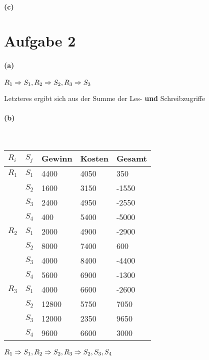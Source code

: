 \documentclass[11pt,a4paper,parskip=half ]{scrartcl}
\begin{document}
	\paragraph{(c)}
	
	
	\section*{Aufgabe 2}
	\paragraph{(a)} 
	$R_{1}\Rightarrow S_{1},\\
	 R_{2}\Rightarrow S_{2},\\
	 R_{3}\Rightarrow S_{3}$
	
	Letzteres ergibt sich aus der Summe der Les- \textbf{und} Schreibzugriffe
	
	\paragraph{(b)}~ 
	\begin{table}[h]
		\begin{tabular}{l|l|l|l|l}
			$R_{i}$	& $S_{j}$ & Gewinn & Kosten & Gesamt \\ \hline \hline
			$R_{1}$ & $S_{1}$ & 4400   & 4050   & 350          \\
					& $S_{2}$ & 1600   & 3150   & -1550        \\
					& $S_{3}$ & 2400   & 4950   & -2550	       \\
					& $S_{4}$ & 400    & 5400   & -5000        \\ \hline
			$R_{2}$ & $S_{1}$ & 2000   & 4900   & -2900        \\
					& $S_{2}$ & 8000   & 7400   & 600          \\
					& $S_{3}$ & 4000   & 8400   & -4400        \\
					& $S_{4}$ & 5600   & 6900   & -1300        \\ \hline
			$R_{3}$ & $S_{1}$ & 4000   & 6600   & -2600        \\
					& $S_{2}$ & 12800  & 5750   & 7050          \\
					& $S_{3}$ & 12000  & 2350   & 9650          \\
					& $S_{4}$ & 9600   & 6600   & 3000         
		\end{tabular}
	\end{table}

	$R_{1}\Rightarrow S_{1},\\
	 R_{2}\Rightarrow S_{2},\\
	 R_{3}\Rightarrow S_{2},S_{3},S_{4}$
	 \newpage
\end{document}

